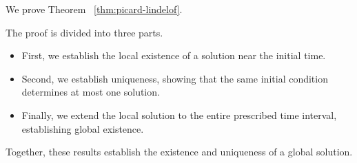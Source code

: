 \documentclass[12pt,a4paper,oneside]{book}
\begin{document}
We prove Theorem ~\ref{thm:picard-lindelof}.

\begin{Notice}
The proof is divided into three parts.
\begin{itemize}
    \item First, we establish the local existence of a solution near the initial time.

    \item Second, we establish uniqueness, showing that the same initial condition determines at most one solution.

    \item Finally, we extend the local solution to the entire prescribed time interval, establishing global existence.
\end{itemize}
Together, these results establish the existence and uniqueness of a global solution.
\end{Notice}
\end{document}
